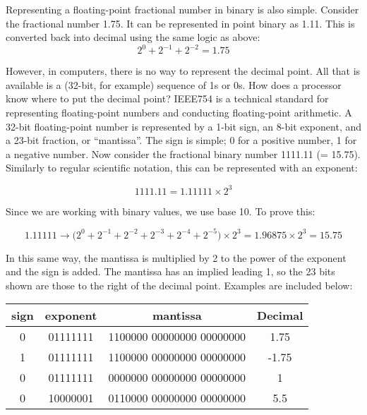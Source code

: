     Representing a floating-point fractional number in binary is also simple. Consider the fractional number 1.75. It can be represented in point binary as 1.11. This is converted back into decimal using the same logic as above:
    $$2^0 + 2^{-1} + 2^{-2} = 1.75 $$

    However, in computers, there is no way to represent the decimal point. All that is available is a (32-bit, for example) sequence of 1s or 0s. How does a processor know where to put the decimal point? \gls{IEEE754} is a technical standard for representing floating-point numbers and conducting floating-point arithmetic.
    A 32-bit floating-point number is represented by a 1-bit sign, an 8-bit exponent, and a 23-bit fraction, or ``mantissa''. The sign is simple; 0 for a positive number, 1 for a negative number. Now consider the fractional binary number 1111.11 (= 15.75). Similarly to regular scientific notation, this can be represented with an exponent:

    $$1111.11 = 1.11111 \times 2^3$$

    Since we are working with binary values, we use base 10. To prove this: 

    $$1.11111 \rightarrow  \Big(2^0 + 2^{-1} + 2^{-2} + 2^{-3} + 2^{-4} + 2^{-5}\Big) \times 2^3   = 1.96875 \times 2^3 = 15.75$$

    In this same way, the mantissa is multiplied by 2 to the power of the exponent and the sign is added. The mantissa has an implied leading 1, so the 23 bits shown are those to the right of the decimal point. Examples are included below: \\
    \begin{table}[H]
    \begin{centering}
    \begin{tabular}{|c|c|c|c|}
    \hline
    \textbf{sign} & \textbf{exponent} & \textbf{mantissa} & \textbf{Decimal}\\
    \hline
    0 & 01111111 & 1100000 00000000 00000000 & 1.75 \\
    \hline
    1 & 01111111 & 1100000 00000000 00000000 & -1.75 \\
    \hline
    0 & 01111111 & 0000000 00000000 00000000 & 1 \\
    \hline
    0 & 10000001 & 0110000 00000000 00000000 & 5.5 \\
    \hline
    \end{tabular}
    \end{centering}
    \end{table}

